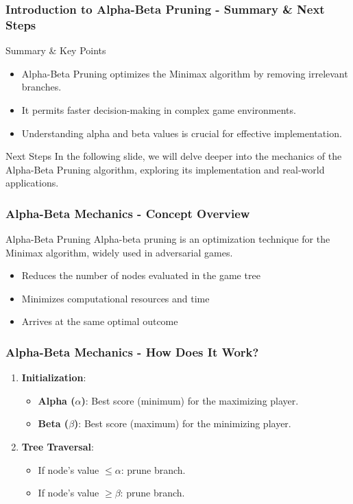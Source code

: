 \documentclass[aspectratio=169]{beamer}
\begin{document}
\begin{frame}[fragile]
    \frametitle{Introduction to Alpha-Beta Pruning - Summary & Next Steps}
    \begin{block}{Summary & Key Points}
        \begin{itemize}
            \item Alpha-Beta Pruning optimizes the Minimax algorithm by removing irrelevant branches.
            \item It permits faster decision-making in complex game environments.
            \item Understanding alpha and beta values is crucial for effective implementation.
        \end{itemize}
    \end{block}
    
    \begin{block}{Next Steps}
        In the following slide, we will delve deeper into the mechanics of the Alpha-Beta Pruning algorithm, exploring its implementation and real-world applications.
    \end{block}
\end{frame}

\begin{frame}[fragile]
    \frametitle{Alpha-Beta Mechanics - Concept Overview}
    \begin{block}{Alpha-Beta Pruning}
        Alpha-beta pruning is an optimization technique for the Minimax algorithm, widely used in adversarial games.
    \end{block}
    \begin{itemize}
        \item Reduces the number of nodes evaluated in the game tree
        \item Minimizes computational resources and time
        \item Arrives at the same optimal outcome
    \end{itemize}
\end{frame}

\begin{frame}[fragile]
    \frametitle{Alpha-Beta Mechanics - How Does It Work?}
    \begin{enumerate}
        \item \textbf{Initialization}:
            \begin{itemize}
                \item \textbf{Alpha ($\alpha$)}: Best score (minimum) for the maximizing player.
                \item \textbf{Beta ($\beta$)}: Best score (maximum) for the minimizing player.
            \end{itemize}
        \item \textbf{Tree Traversal}:
            \begin{itemize}
                \item If node's value $\leq \alpha$: prune branch.
                \item If node's value $\geq \beta$: prune branch.
            \end{itemize}
    \end{enumerate}
\end{frame}
\end{document}
